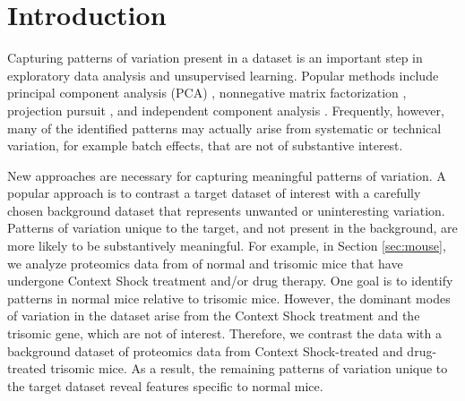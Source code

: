 \documentclass[nocrop]{bioinfo}
\begin{document}
\maketitle

\section{Introduction}

Capturing patterns of variation present in a dataset is an important step in exploratory data analysis and unsupervised learning. Popular methods include principal component analysis (PCA) \cite{pca}, nonnegative matrix factorization \cite{Lee1999}, projection pursuit \cite{pp}, and independent component analysis \cite{ica}. Frequently, however, many of the identified patterns may actually arise from systematic or technical variation, for example batch effects, that are not of substantive interest.

New approaches are necessary for capturing meaningful patterns of variation. A popular approach is to contrast a target dataset of interest with a carefully chosen background dataset that represents unwanted or uninteresting variation. Patterns of variation unique to the target, and not present in the background, are more likely to be substantively meaningful.
For example, in Section \ref{sec:mouse}, we analyze proteomics data from of normal and trisomic mice that have undergone Context Shock treatment and/or drug therapy. One goal is to identify patterns in normal mice relative to trisomic mice. However, the dominant modes of variation in the dataset arise from the Context Shock treatment and the trisomic gene, which are not of interest. Therefore, we contrast the data with a background dataset of proteomics data from Context Shock-treated and drug-treated trisomic mice. As a result, the remaining patterns of variation unique to the target dataset reveal features specific to normal mice.
\end{document}
